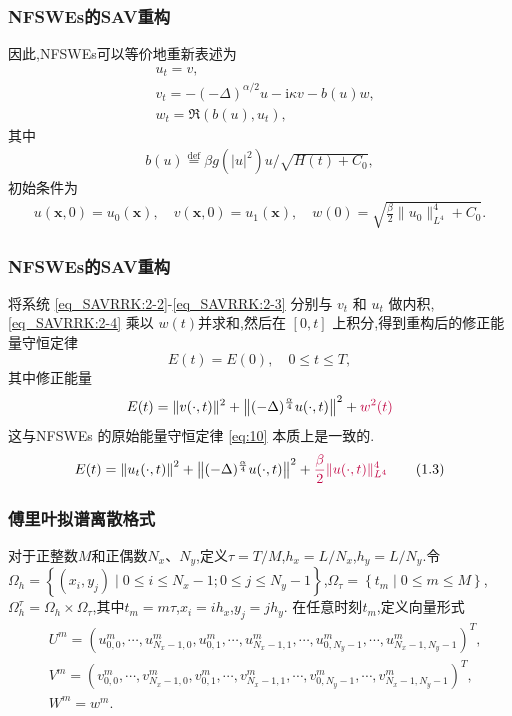 \documentclass[aspectratio=169]{beamer}
\numberwithin{theorem}{section} %
\numberwithin{equation}{section}%
\numberwithin{figure}{section}%
\numberwithin{table}{section}%
\begin{document}
\begin{frame}\frametitle{NFSWEs的SAV重构}
因此,NFSWEs可以等价地重新表述为
{\color{purple}\begin{align}
& u_t=v, \label{eq_SAVRRK:2-2}\\
& v_t=-(-\Delta)^{\alpha / 2} u-\mathrm{i}\kappa v-b(u) w, \label{eq_SAVRRK:2-3}\\
& w_t=\Re\left(b(u), u_t\right),\label{eq_SAVRRK:2-4}
\end{align}}
其中
\begin{align}
b(u)\overset{\text{def}}{=}\beta g(|u|^2) u / \sqrt{H(t)+C_0},
\end{align}
初始条件为
\begin{align}\label{eq_SAVRRK:31}
	u(\boldsymbol{x}, 0)=u_{0}(\boldsymbol{x}), \quad v(\boldsymbol{x}, 0)=u_{1}(\boldsymbol{x}), \quad w(0)=\sqrt{\frac{\beta}{2}\|u_{0}\|_{L^{4}}^{4} +C_0}.
\end{align}
\end{frame}

\begin{frame}\frametitle{NFSWEs的SAV重构}
	将系统 \eqref{eq_SAVRRK:2-2}-\eqref{eq_SAVRRK:2-3} 分别与 $v_t$ 和 $u_t$ 做内积, 
\eqref{eq_SAVRRK:2-4} 乘以 $w(t)$并求和,然后在 $[0, t]$ 上积分,得到重构后的修正能量守恒定律
\begin{equation}
E(t)=E(0), \quad 0 \leq t \leq T ,
\end{equation}
其中修正能量
\begin{equation}
	E(t)=\|v(\cdot, t)\|^2+\left\|(-\Delta)^{\frac{\alpha}{4}} u(\cdot, t)\right\|^{2}+\textcolor{purple}{w^2(t)}
\end{equation}
这与NFSWEs 的原始能量守恒定律 \eqref{eq:10} 本质上是一致的.
\begin{equation}
	E(t)=\left\|u_t(\cdot, t)\right\|^2+\left\|(-\Delta)^{\frac{\alpha}{4}} u(\cdot, t)\right\|^2+\textcolor{purple}{\frac{\beta}{2}\|u(\cdot, t)\|_{L^4}^4} \tag{1.3}
\end{equation}
\end{frame}

\begin{frame}\frametitle{傅里叶拟谱离散格式}
	对于正整数$M$和正偶数$N_{x}$、$N_{y}$,定义$\tau={T}/{M}$,$h_{x}={L}/{N_{x}}$,$h_{y}={L}/{N_{y}}$.令$\Omega_{h}=\left\{(x_{i}, y_{j}) \mid 0 \leq i \leq N_x-1;0 \leq j \leq N_y-1\right\}$,$\Omega_{\tau}=\left\{t_{m} \mid 0 \leq m \leq M\right\}$,$\Omega_{h}^{\tau}=\Omega_{h} \times \Omega_{\tau}$,其中$t_{m}=m \tau$,$x_{i}=i h_{x}$,$y_{j}=j h_{y}$.
	在任意时刻$t_m$,定义向量形式
	\begin{align}\label{eq_SAVRRK:47}
	&U^m=\left(u_{0,0}^m, \cdots, u_{N_{x}-1,0}^m, u_{0,1}^m, \cdots, u_{N_{x}-1,1}^m, \cdots, u_{0, N_{y}-1}^m, \cdots, u_{N_{x}-1, N_{y}-1}^m\right)^{T},\\
	&V^m=\left(v_{0,0}^m, \cdots, v_{N_{x}-1,0}^m, v_{0,1}^m, \cdots, v_{N_{x}-1,1}^m, \cdots, v_{0, N_{y}-1}^m, \cdots, v_{N_{x}-1, N_{y}-1}^m\right)^{T},\\
	&W^m=w^m.
	\end{align}
	
\end{frame}
\end{document}
